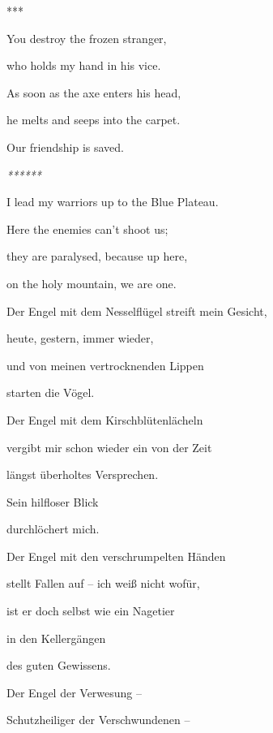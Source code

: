 \bigskip


\bigskip

***

You destroy the frozen stranger,

who holds my hand in his vice.

As soon as the axe enters his head,

he melts and seeps into the carpet.

Our friendship is saved.


\bigskip

\emph{
******}


\bigskip


\bigskip

I lead my warriors up to the Blue Plateau.

Here the enemies can't shoot us;

they are paralysed, because up here, 

on the holy mountain, we are one.


\bigskip


\bigskip



\bigskip

Der Engel mit dem Nesselflügel streift mein Gesicht,

heute, gestern, immer wieder,

und von meinen vertrocknenden Lippen

starten die Vögel.


\bigskip

Der Engel mit dem Kirschblütenlächeln

vergibt mir schon wieder ein von der Zeit 

längst überholtes Versprechen.

Sein hilfloser Blick 

durchlöchert mich.


\bigskip

Der Engel mit den verschrumpelten Händen

stellt Fallen auf -- ich weiß nicht wofür,

ist er doch selbst wie ein Nagetier

in den Kellergängen 

des guten Gewissens.


\bigskip

Der Engel der Verwesung -- 

Schutzheiliger der Verschwundenen --

